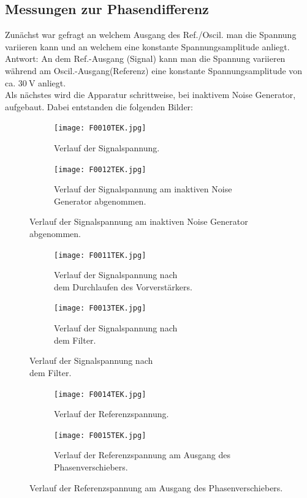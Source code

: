 \documentclass[
  bibliography=totoc,     %
  captions=tableheading,  %
  titlepage=firstiscover, %
]{scrartcl}
\begin{document}
\subsection{Messungen zur Phasendifferenz}
Zunächst war gefragt an welchem Ausgang des Ref./Oscil. man die Spannung variieren
kann und an welchem eine konstante Spannungsamplitude anliegt.\\
Antwort: An dem Ref.-Ausgang (Signal) kann man die Spannung variieren während am
Oscil.-Ausgang(Referenz) eine konstante Spannungsamplitude von ca. $\SI{30}{\volt}$
anliegt.
\\
Als nächstes wird die Apparatur schrittweise, bei inaktivem Noise Generator, aufgebaut.
Dabei entstanden die folgenden Bilder:
\begin{figure}[htb]
  \centering
  \begin{subfigure}{0.48\textwidth}
    \centering
    \texttt{[image: F0010TEK.jpg]}
    \caption{Verlauf der Signalspannung.\\}
    \label{fig:1}
    \qquad
  \end{subfigure}
  \begin{subfigure}{0.48\textwidth}
    \centering
    \texttt{[image: F0012TEK.jpg]}
    \caption{Verlauf der Signalspannung am inaktiven Noise Generator abgenommen.}
    \label{fig:2}
    \qquad
  \end{subfigure}
\end{figure}
\begin{figure}[htb]
  \centering
  \begin{subfigure}{0.48\textwidth}
    \centering
    \texttt{[image: F0011TEK.jpg]}
    \caption{Verlauf der Signalspannung nach\\ dem Durchlaufen des Vorverstärkers.}
    \label{fig:3}
    \qquad
  \end{subfigure}
  \begin{subfigure}{0.48\textwidth}
    \centering
    \texttt{[image: F0013TEK.jpg]}
    \caption{Verlauf der Signalspannung nach\\ dem Filter.}
    \label{fig:4}
    \qquad
  \end{subfigure}
\end{figure}
\begin{figure}[htb]
  \centering
  \begin{subfigure}{0.48\textwidth}
    \centering
    \texttt{[image: F0014TEK.jpg]}
    \caption{Verlauf der Referenzspannung.}
    \label{fig:5}
    \qquad
  \end{subfigure}
  \begin{subfigure}{0.48\textwidth}
    \centering
    \texttt{[image: F0015TEK.jpg]}
    \caption{Verlauf der Referenzspannung am Ausgang des Phasenverschiebers.}
    \label{fig:6}
    \qquad
  \end{subfigure}
\end{figure}\\
\end{document}
